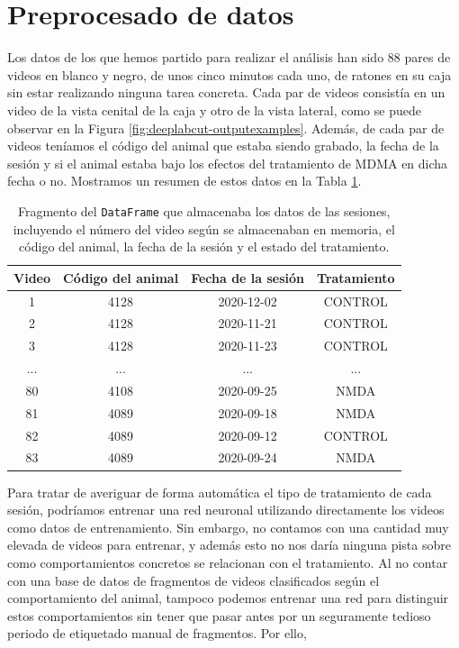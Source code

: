 \section{Preprocesado de datos}

Los datos de los que hemos partido para realizar el análisis han sido 88 pares de videos en blanco y negro, de unos cinco minutos cada uno, de ratones en su caja sin estar realizando ninguna tarea concreta. Cada par de videos consistía en un video de la vista cenital de la caja y otro de la vista lateral, como se puede observar en la Figura \ref{fig:deeplabcut-outputexamples}. Además, de cada par de videos teníamos el código del animal que estaba siendo grabado, la fecha de la sesión y si el animal estaba bajo los efectos del tratamiento de MDMA en dicha fecha o no. Mostramos un resumen de estos datos en la Tabla \ref{tab:animal-info}.

\begin{table}
  \centering
  \begin{tabular}[h]{|c|c|c|c|}
    \hline
    \textbf{Video} & \textbf{Código del animal} & \textbf{Fecha de la sesión} & \textbf{Tratamiento} \\ 
    \hline
    1 & 4128	& 2020-12-02	& CONTROL \\ 	
    2 & 4128	& 2020-11-21	& CONTROL \\ 	
    3 & 4128	& 2020-11-23	& CONTROL \\ 
    ... &  ...	& ... & ... \\ 
    80 & 4108	& 2020-09-25	& NMDA	\\ 
    81 & 4089	& 2020-09-18	& NMDA	\\
    82 & 4089	& 2020-09-12	& CONTROL	\\ 
    83 & 4089	& 2020-09-24	& NMDA	\\
    \hline
  \end{tabular}
  \caption[Datos de las sesiones]{Fragmento del \texttt{DataFrame} que almacenaba los datos de las sesiones, incluyendo el número del video según se almacenaban en memoria, el código del animal, la fecha de la sesión y el estado del tratamiento.}
  \label{tab:animal-info}
\end{table}

Para tratar de averiguar de forma automática el tipo de tratamiento de cada sesión, podríamos entrenar una red neuronal utilizando directamente los videos como datos de entrenamiento. Sin embargo, no contamos con una cantidad muy elevada de videos para entrenar, y además esto no nos daría ninguna pista sobre como comportamientos concretos se relacionan con el tratamiento. Al no contar con una base de datos de fragmentos de videos clasificados según el comportamiento del animal, tampoco podemos entrenar una red para distinguir estos comportamientos sin tener que pasar antes por un seguramente tedioso periodo de etiquetado manual de fragmentos. Por ello, 

